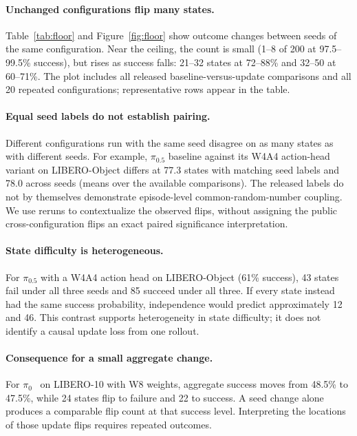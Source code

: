 \documentclass{article}
\newcommand{\pizero}{$\pi_0$\xspace}
\newcommand{\pizerofive}{$\pi_{0.5}$\xspace}
\begin{document}
\paragraph{Unchanged configurations flip many states.}
Table~\ref{tab:floor} and Figure~\ref{fig:floor} show outcome changes between seeds
of the same configuration. Near the ceiling, the count is small
(1--8 of 200 at 97.5--99.5\% success), but rises as success falls:
21--32 states at 72--88\% and 32--50 at 60--71\%.
The plot includes all released baseline-versus-update comparisons and all 20 repeated
configurations; representative rows appear in the table.

\paragraph{Equal seed labels do not establish pairing.}
Different configurations run with the same seed disagree on as many states as with
different seeds. For example, \pizerofive baseline against its W4A4 action-head variant
on LIBERO-Object differs at 77.3 states with matching seed labels and 78.0 across seeds
(means over the available comparisons). The released labels do not by themselves
demonstrate episode-level common-random-number coupling. We use reruns to contextualize
the observed flips, without assigning the public cross-configuration flips an exact
paired significance interpretation.

\paragraph{State difficulty is heterogeneous.}
For \pizerofive with a W4A4 action head on LIBERO-Object (61\% success), 43 states fail
under all three seeds and 85 succeed under all three. If every state instead had the
same success probability, independence would predict approximately 12 and 46.
This contrast supports heterogeneity in state difficulty; it does not identify a
causal update loss from one rollout.

\paragraph{Consequence for a small aggregate change.}
For \pizero~\citep{black2024pi0} on LIBERO-10 with W8 weights, aggregate success moves
from 48.5\% to 47.5\%, while 24 states flip to failure and 22 to success.
A seed change alone produces a comparable flip count at that success level.
Interpreting the locations of those update flips requires repeated outcomes.
\end{document}
